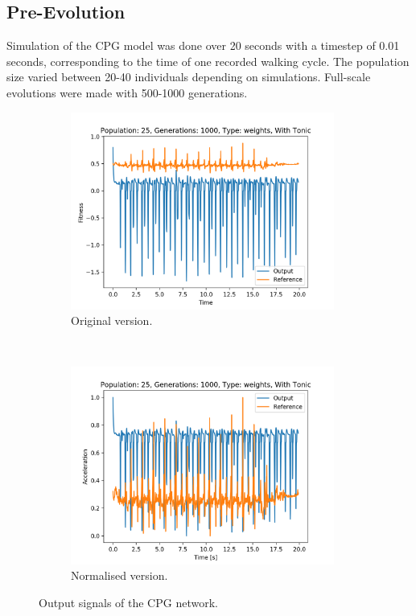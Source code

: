 \subsection{Pre-Evolution}
Simulation of the CPG model was done over 20 seconds with a timestep of 0.01 seconds, corresponding to the time of one recorded walking cycle. The population size varied between 20-40 individuals depending on simulations. Full-scale evolutions were made with 500-1000 generations.

\begin{figure}[htbp]
    \centering
        
    \begin{subfigure}[b]{0.45\textwidth}
        \centering
        \includegraphics[width=0.95\textwidth]{include/figure/output_pop25_gen1000_type0_with.png}
        \caption{Original version.}
        \label{fig:result_1a}
    \end{subfigure}
    ~ 
    \begin{subfigure}[b]{0.45\textwidth}
        \centering
        \includegraphics[width=0.95\textwidth]{include/figure/best_individual_output_pop25_gen1000_type0_with_normalised.png}
        \caption{Normalised version.}
        \label{fig:result_1b}
    \end{subfigure}%
    \caption{Output signals of the CPG network.}
    \label{fig:result_1}
\end{figure}

